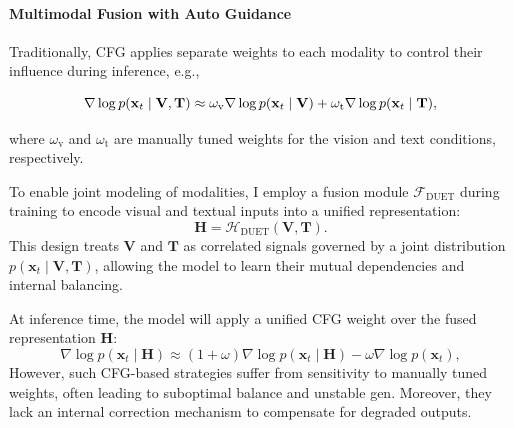 \documentclass[a4paper,12pt]{article}
\begin{document}
\paragraph{Multimodal Fusion with Auto Guidance}

Traditionally, CFG applies separate weights to each modality to control their influence during inference, e.g.,

\begin{equation}
\nabla \log p(\mathbf{x}_t \mid \mathbf{V}, \mathbf{T}) \approx \omega_{\text{v}} \nabla \log p(\mathbf{x}_t \mid \mathbf{V}) \\ 
+ \omega_{\text{t}} \nabla \log p(\mathbf{x}_t \mid \mathbf{T}),
\end{equation}

where $\omega_{\text{v}}$ and $\omega_{\text{t}}$ are manually tuned weights for the vision and text conditions, respectively.

To enable joint modeling of modalities, I employ a fusion module $\mathcal{F}_{\text{DUET}}$ during training to encode visual and textual inputs into a unified representation:
\begin{equation} \label{eqn:F}
\mathbf{H} = \mathcal{H}_{\text{DUET}}(\mathbf{V}, \mathbf{T}).
\end{equation}
This design treats $\mathbf{V}$ and $\mathbf{T}$ as correlated signals governed by a joint distribution \( p(\mathbf{x}_t \mid \mathbf{V}, \mathbf{T}) \), allowing the model to learn their mutual dependencies and internal balancing.

At inference time, the model will apply a unified CFG weight over the fused representation $\mathbf{H}$:
\begin{equation}
\nabla \log p(\mathbf{x}_t \mid \mathbf{H}) \approx (1 \!+\! \omega) \nabla \log p(\mathbf{x}_t \mid \mathbf{H}) \!-\! \omega \nabla \log p(\mathbf{x}_t),
\end{equation}
However, such CFG-based strategies suffer from sensitivity to manually tuned weights, often leading to suboptimal balance and unstable gen. Moreover, they lack an internal correction mechanism to compensate for degraded outputs.
\end{document}
